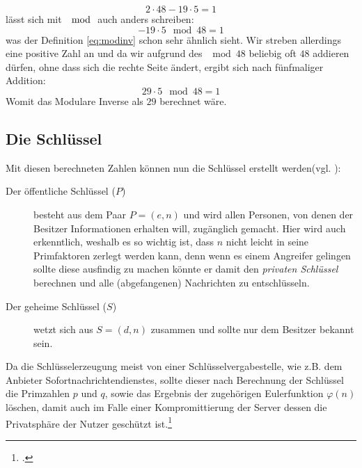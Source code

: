 \documentclass{scrarticle}
\begin{document}
            \begin{equation}
                2\cdot48-19\cdot5=1
            \end{equation}
            lässt sich mit $\mod$ auch anders schreiben: %
            \begin{equation}
                -19\cdot5\mod{48}=1
            \end{equation}
            was der Definition \ref{eq:modinv} schon sehr ähnlich sieht. Wir streben allerdings eine positive Zahl an und da wir aufgrund des $\mod{48}$ beliebig oft $48$ addieren dürfen, ohne dass sich die rechte Seite ändert, ergibt sich nach fünfmaliger Addition:
            \begin{equation}
                29\cdot5\mod{48} = 1
            \end{equation}
            Womit das Modulare Inverse als $29$ berechnet wäre.



        \subsection{Die Schlüssel}
            Mit diesen berechneten Zahlen können nun die Schlüssel erstellt werden(vgl. \cite[77]{ertel2003}):
            \begin{description}
                \item[Der öffentliche Schlüssel ($P$)] besteht aus dem Paar $P=(e, n)$ und wird allen Personen, von denen der Besitzer Informationen erhalten will, zugänglich gemacht. Hier wird auch erkenntlich, weshalb es so wichtig ist, dass $n$ nicht leicht in seine Primfaktoren zerlegt werden kann, denn wenn es einem Angreifer gelingen sollte diese ausfindig zu machen könnte er damit den \emph{privaten Schlüssel} berechnen und alle (abgefangenen) Nachrichten zu entschlüsseln.
                \item[Der geheime Schlüssel ($S$)] wetzt sich aus $S=(d, n)$ zusammen und sollte nur dem Besitzer bekannt sein. 
            \end{description}
            Da die Schlüsselerzeugung meist von einer Schlüsselvergabestelle, wie z.B. dem Anbieter Sofortnachrichtendienstes, sollte dieser nach Berechnung der Schlüssel die Primzahlen $p$ und $q$, sowie das Ergebnis der zugehörigen Eulerfunktion $\varphi(n)$ löschen, damit auch im Falle einer Kompromittierung der Server dessen die Privatsphäre der Nutzer geschützt ist.\footcite[279]{dankmeier2006} %
\end{document}
